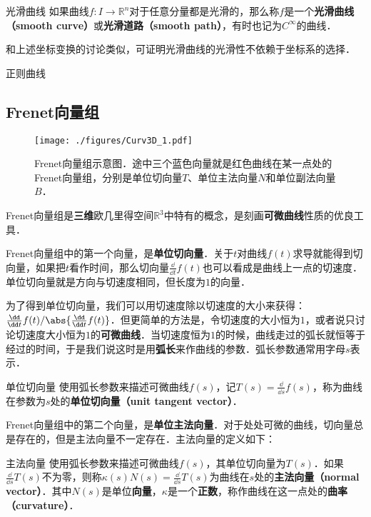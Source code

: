 \begin{definition}{光滑曲线}
如果曲线$f:I\to\mathbb{R}^n$对于任意分量都是光滑的，那么称$f$是一个\textbf{光滑曲线（smooth curve）}或\textbf{光滑道路（smooth path）}，有时也记为$C^\infty$的曲线．
\end{definition}

和上述坐标变换的讨论类似，可证明光滑曲线的光滑性不依赖于坐标系的选择．

\begin{definition}{正则曲线}

\end{definition}

\subsection{Frenet向量组}

\begin{figure}[ht]
\centering
\texttt{[image: ./figures/Curv3D\_1.pdf]}
\caption{Frenet向量组示意图．途中三个蓝色向量就是红色曲线在某一点处的Frenet向量组，分别是单位切向量$T$、单位主法向量$N$和单位副法向量$B$．} \label{Curv3D_fig1}
\end{figure}

Frenet向量组是\textbf{三维}欧几里得空间$\mathbb{R}^3$中特有的概念，是刻画\textbf{可微曲线}性质的优良工具．

Frenet向量组中的第一个向量，是\textbf{单位切向量}．关于$t$对曲线$f(t)$求导就能得到切向量，如果把$t$看作时间，那么切向量$\frac{\dd}{\dd t}f(t)$也可以看成是曲线上一点的切速度．单位切向量就是方向与切速度相同，但长度为$1$的向量．

为了得到单位切向量，我们可以用切速度除以切速度的大小来获得：$\frac{\dd}{\dd t}f(t)/\abs{\frac{\dd}{\dd t}f(t)}$．但更简单的方法是，令切速度的大小恒为$1$，或者说只讨论切速度大小恒为$1$的\textbf{可微曲线}．当切速度恒为$1$的时候，曲线走过的弧长就恒等于经过的时间，于是我们说这时是用\textbf{弧长}来作曲线的参数．弧长参数通常用字母$s$表示．

\begin{definition}{单位切向量}\label{Curv3D_def1}
使用弧长参数来描述可微曲线$f(s)$，记$T(s)=\frac{\dd}{\dd s}f(s)$，称为曲线在参数为$s$处的\textbf{单位切向量（unit tangent vector）}．
\end{definition}

Frenet向量组中的第二个向量，是\textbf{单位主法向量}．对于处处可微的曲线，切向量总是存在的，但是主法向量不一定存在．主法向量的定义如下：

\begin{definition}{主法向量}\label{Curv3D_def2}
使用弧长参数来描述可微曲线$f(s)$，其单位切向量为$T(s)$．如果$\frac{\dd}{\dd s}T(s)$不为零，则称$\kappa(s) N(s)=\frac{\dd}{\dd s}T(s)$为曲线在$s$处的\textbf{主法向量（normal vector）}．其中$N(s)$是单位\textbf{向量}，$\kappa$是一个\textbf{正数}，称作曲线在这一点处的\textbf{曲率（curvature）}．
\end{definition}

